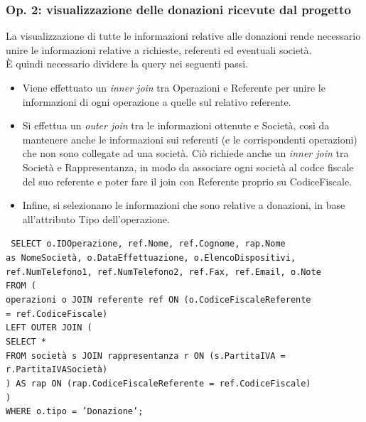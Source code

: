\documentclass[a4paper,12pt]{report}
\begin{document}
\subsubsection{Op. 2: visualizzazione delle donazioni ricevute dal progetto}

La visualizzazione di tutte le informazioni relative alle donazioni rende necessario unire le informazioni relative a richieste, referenti ed eventuali società. \\
È quindi necessario dividere la query nei seguenti passi.
\begin{itemize}
    \item Viene effettuato un \textit{inner join} tra Operazioni e Referente per unire le informazioni di ogni operazione a quelle sul relativo referente.
    \item Si effettua un \textit{outer join} tra le informazioni ottenute e Società, così da mantenere anche le informazioni sui referenti (e le corrispondenti operazioni) che non sono collegate ad una società. Ciò richiede anche un \textit{inner join} tra Società e Rappresentanza, in modo da associare ogni società al codce fiscale del suo referente e poter fare il join con Referente proprio su CodiceFiscale.
    \item Infine, si selezionano le informazioni che sono relative a donazioni, in base all'attributo Tipo dell'operazione.
\end{itemize}

\noindent \texttt{
SELECT o.IDOperazione, ref.Nome, ref.Cognome, rap.Nome \\
as NomeSocietà, o.DataEffettuazione, o.ElencoDispositivi, \\
ref.NumTelefono1, ref.NumTelefono2, ref.Fax, ref.Email, o.Note \\
FROM ( \\
    \indent operazioni o JOIN referente ref ON (o.CodiceFiscaleReferente \\
    \indent = ref.CodiceFiscale) \\
    \indent LEFT OUTER JOIN ( \\
        \indent \indent SELECT * \\
        \indent \indent FROM società s JOIN rappresentanza r ON (s.PartitaIVA = \\
        \indent \indent r.PartitaIVASocietà) \\
    \indent ) AS rap ON (rap.CodiceFiscaleReferente = ref.CodiceFiscale) \\
) \\
WHERE o.tipo = 'Donazione';
}
\end{document}
